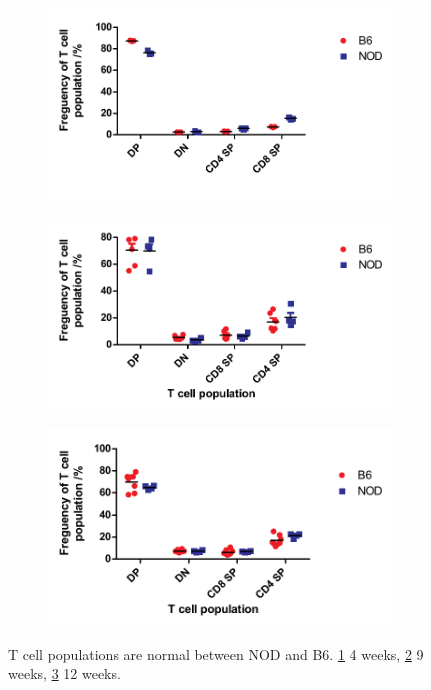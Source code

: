 \begin{figure}
	\begin{subfigure}{0.5\textwidth}
	\caption{}
	\includegraphics[width=\textwidth]{Figures/4wkThyTcells.pdf}
	\label{subfig:4wkThyTcells}
	\end{subfigure}
	\begin{subfigure}{0.5\textwidth}
	\caption{}
 	\includegraphics[width=\textwidth]{Figures/9wkThyTcells.pdf}
	\label{subfig:9wkThyTcells}
	\end{subfigure}
	
	\begin{subfigure}{0.5\textwidth}
	\centering
	\caption{}
 	\includegraphics[width=\textwidth]{Figures/12wkThyTcells.pdf}
	\label{subfig:12wkThyTcells}
	\end{subfigure}
\caption[T cell development is normal in the NOD mouse]{T cell populations are normal between NOD and B6. \ref{subfig:4wkThyTcells} 4 weeks, \ref{subfig:9wkThyTcells} 9 weeks, \ref{subfig:12wkThyTcells} 12 weeks.}
\label{fig:NODB6Tcells}
\end{figure}


